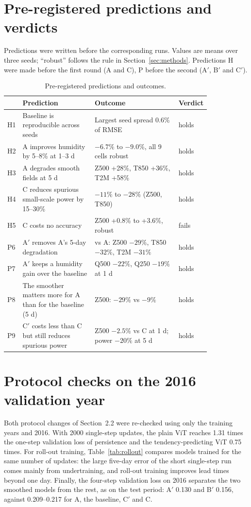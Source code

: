 \documentclass{article}
\begin{document}
\section{Pre-registered predictions and verdicts}
\label{app:predictions}
Predictions were written before the corresponding runs. Values are means over three seeds; ``robust'' follows the rule in Section~\ref{sec:methods}. Predictions H were made before the first round (A and C), P before the second (A$'$, B$'$ and C$'$).

\begin{table}[H]
  \caption{Pre-registered predictions and outcomes.}
  \label{tab:predictions}
  \centering
  \small
  \begin{tabular}{p{0.05\linewidth}p{0.36\linewidth}p{0.42\linewidth}l}
    \toprule
    & Prediction & Outcome & Verdict \\
    \midrule
    H1 & Baseline is reproducible across seeds & Largest seed spread 0.6\% of RMSE & holds \\
    H2 & A improves humidity by 5--8\% at 1--3 d & $-6.7\%$ to $-9.0\%$, all 9 cells robust & holds \\
    H3 & A degrades smooth fields at 5 d & Z500 +28\%, T850 +36\%, T2M +58\% & holds \\
    H4 & C reduces spurious small-scale power by 15--30\% & $-11\%$ to $-28\%$ (Z500, T850) & holds \\
    H5 & C costs no accuracy & Z500 +0.8\% to +3.6\%, robust & fails \\
    P6 & A$'$ removes A's 5-day degradation & vs A: Z500 $-29\%$, T850 $-32\%$, T2M $-31\%$ & holds \\
    P7 & A$'$ keeps a humidity gain over the baseline & Q500 $-22\%$, Q250 $-19\%$ at 1 d & holds \\
    P8 & The smoother matters more for A than for the baseline (5 d) & Z500: $-29\%$ vs $-9\%$ & holds \\
    P9 & C$'$ costs less than C but still reduces spurious power & Z500 $-2.5\%$ vs C at 1 d; power $-20\%$ at 5 d & holds \\
    \bottomrule
  \end{tabular}
\end{table}

\section{Protocol checks on the 2016 validation year}
\label{app:validation}
Both protocol changes of Section~2.2 were re-checked using only the training years and 2016. With 2000 single-step updates, the plain ViT reaches 1.31 times the one-step validation loss of persistence and the tendency-predicting ViT 0.75 times. For roll-out training, Table~\ref{tab:rollout} compares models trained for the same number of updates: the large five-day error of the short single-step run comes mainly from undertraining, and roll-out training improves lead times beyond one day. Finally, the four-step validation loss on 2016 separates the two smoothed models from the rest, as on the test period: A$'$ 0.130 and B$'$ 0.156, against 0.209--0.217 for A, the baseline, C$'$ and C.
\end{document}
